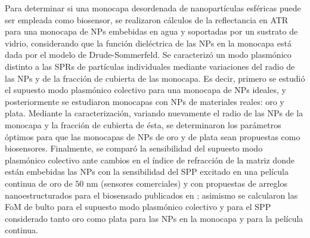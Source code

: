 Para determinar si una monocapa desordenada de nanopartículas esféricas puede ser empleada como biosensor, se realizaron cálculos de la reflectancia en ATR para una monocapa de NPs embebidas en agua y soportadas por un sustrato de vidrio, considerando que la función dieléctrica de las NPs en la monocapa está dada por el modelo de Drude-Sommerfeld. Se caracterizó un modo plasmónico distinto a las SPRs de partículas individuales mediante variaciones del radio de las NPs y de la fracción de cubierta de las monocapa. Es decir, primero se estudió el supuesto modo plasmónico colectivo para una monocapa de NPs ideales, y posteriormente se estudiaron monocapas con NPs de materiales reales: oro y plata. Mediante la caracterización, variando nuevamente el radio de las NPs de la monocapa y la fracción de cubierta de ésta, se determinaron los parámetros óptimos para que las monocapas de NPs de oro y de plata sean propuestas como biosensores. Finalmente, se comparó la sensibilidad del supuesto modo plasmónico colectivo ante cambios en el índice de refracción de la matriz donde están embebidas las NPs con la sensibilidad del SPP excitado en una película continua de oro de $50$ nm (sensores comerciales) y con propuestas de arreglos nanoestructurados para el biosensado publicados en \cite{kabashin2009plasmonic,danilov2018ultra,svedendahl2009refractometric}; asimismo se calcularon las FoM de bulto para el supuesto modo plasmónico colectivo y para el SPP considerado tanto oro como plata para las NPs en la monocapa y para la película continua.

